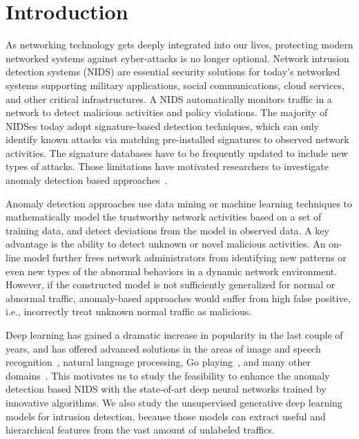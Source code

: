\section{Introduction}
As networking technology gets deeply integrated into our lives, protecting modern networked systems against cyber-attacks is no longer optional.
Network intrusion detection systems (NIDS) are essential security solutions for today's networked systems supporting military applications, social communications, cloud services, and other critical infrastructures. A NIDS automatically monitors traffic in a network to detect malicious activities and policy violations.
The majority of NIDSes today adopt signature-based detection techniques, which can only identify known attacks via matching pre-installed signatures to observed network activities. 
The signature databases have to be frequently updated to include new types of attacks. Those limitations have motivated researchers to investigate anomaly detection based approaches~\cite{STL-NIDS, LOF, RankingOutliner, NB-Tree, RampLossKSVCR, GAA-ADS}. 

Anomaly detection approaches use data mining or machine learning techniques to mathematically model the trustworthy network activities based on a set of training data, and detect deviations from the model in observed data. A key advantage is the ability to detect unknown or novel malicious activities.
An on-line model further frees network administrators from identifying new patterns or even new types of the abnormal behaviors in a dynamic network environment.
However, if the constructed model is not sufficiently generalized for normal or abnormal traffic, anomaly-based approaches would suffer from high false positive, i.e., incorrectly treat unknown normal traffic as malicious.

Deep learning has gained a dramatic increase in popularity in the last couple of years, and has offered advanced solutions in the areas of image and speech recognition~\cite{AlexNet, SpeechDNN}, natural language processing\cite{Word2Vec}, Go playing~\cite{AlphaGo}, and many other domains~\cite{DeepLearning}. 
This motivates us to study the feasibility to enhance the anomaly detection based NIDS with the state-of-art deep neural networks trained by innovative algorithms.
We also study the unsupervised generative deep learning models for intrusion detection, because those models can extract useful and hierarchical features from the vast amount of unlabeled traffics. 

